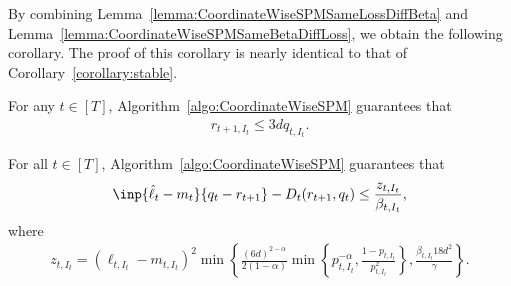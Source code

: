 By combining Lemma~\ref{lemma:CoordinateWiseSPMSameLossDiffBeta} and Lemma~\ref{lemma:CoordinateWiseSPMSameBetaDiffLoss}, we obtain the following corollary. The proof of this corollary is nearly identical to that of Corollary~\ref{corollary:stable}.
\begin{corollary}
    For any $t \in [T]$, Algorithm~\ref{algo:CoordinateWiseSPM} guarantees that
    \begin{align*}
        r_{t+1, I_t} \leq 3d q_{t,I_t}.
    \end{align*}
    \label{corollary:rtplus1Is3dqtIt}
\end{corollary}
\begin{lemma}
    For all $t \in [T]$, Algorithm~\ref{algo:CoordinateWiseSPM} guarantees that 
    \begin{align*}
        \inp{\hat{\ell}_t - m_t}{q_t - r_{t+1}} - D_t(r_{t+1}, q_t) \leq \frac{z_{t,I_t}}{\beta_{t,I_t}},
    \end{align*}
    where 
    \begin{align*}
        z_{t,I_t} = (\ell_{t,I_t} - m_{t,I_t})^2 \min\left\{ \frac{(6d)^{2-\alpha}}{2(1-\alpha)}\min\left\{p_{t,I_t}^{-\alpha}, \frac{1 - p_{t,I_t}}{p_{t,I_t}^2}\right\}, \frac{\beta_{t,I_t} 18d^2}{\gamma}\right\}.
    \end{align*}
\end{lemma}
